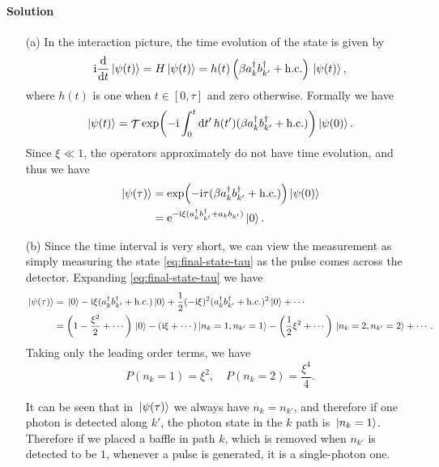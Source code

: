 \documentclass[hyperref, a4paper]{article}
\DeclareMathOperator{\timeorder}{\mathcal{T}}
\newcommand*{\ii}{\mathrm{i}}
\newcommand*{\ee}{\mathrm{e}}
\begin{document}
\paragraph{Solution} \begin{itemize}
    \item[(a)] In the interaction picture, the time evolution of the state is given by
    \[
        \ii \dv{t} \ket*{\psi(t)} = H \ket*{\psi(t)} = h(t) \left( \beta a^\dagger_{k} b_{k'}^\dagger + \text{h.c.} \right) \ket*{\psi(t)},
    \] 
    where $h(t)$ is one when $t \in [0, \tau]$ and zero otherwise.
    Formally we have 
    \[
        \ket*{\psi(t)} = \timeorder \exp(- \ii \int_0^t \dd{t'} h(t') (\beta a^\dagger_k b^\dagger_{k'} + \text{h.c.})) \ket*{\psi(0)}.
    \]
    Since $\xi \ll 1$, the operators approximately do not have time evolution, and thus we have 
    \begin{equation}
        \begin{aligned}
            \ket*{\psi(\tau)} &= \exp(- \ii \tau (\beta a^\dagger_k b^\dagger_{k'} + \text{h.c.})) \ket*{\psi(0)} \\
            &= \ee^{- \ii \xi (a^\dagger_k b^\dagger_{k'} + a_k b_{k'})} \ket*{0} .
        \end{aligned}
        \label{eq:final-state-tau}
    \end{equation}
    \item[(b)] Since the time interval is very short, we can view the measurement as simply measuring the state \eqref{eq:final-state-tau} as the pulse comes across the detector.
    Expanding \eqref{eq:final-state-tau} we have 
    \[
        \begin{aligned}
            \ket*{\psi(\tau)} &= \ket*{0} - \ii \xi (a^\dagger_{k} b^\dagger_{k'} + \text{h.c.}) \ket*{0} + \frac{1}{2} (- \ii \xi)^2 (a^\dagger_{k} b^\dagger_{k'} + \text{h.c.})^2 \ket*{0} + \cdots \\
            &= \left( 1 - \frac{\xi^2}{2} + \cdots \right) \ket*{0} - (\ii \xi + \cdots) \ket*{n_k = 1, n_{k'} = 1} - \left( \frac{1}{2} \xi^2 + \cdots \right) \ket*{n_k = 2, n_{k'} = 2} + \cdots.  
        \end{aligned}
    \] 
    Taking only the leading order terms, we have 
    \begin{equation}
        P(n_k = 1) = \xi^2, \quad P(n_k = 2) = \frac{\xi^4}{4}.
    \end{equation}

    It can be seen that in $\ket*{\psi(\tau)}$ we always have $n_k = n_{k'}$, and therefore if one photon is detected along $k'$, the photon state in the $k$ path is $\ket*{n_k = 1}$.
    Therefore if we placed a baffle in path $k$, which is removed when $n_{k'}$ is detected to be $1$, whenever a pulse is generated, it is a single-photon one.
\end{itemize}
\end{document}
